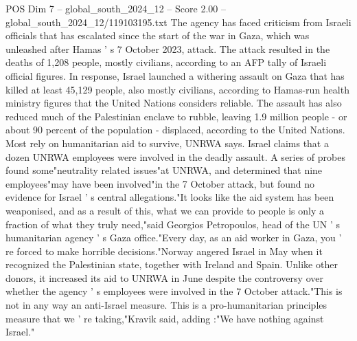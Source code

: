 \begin{textsample}{POS Dim 7 – global\_south\_2024\_12 – Score 2.00 – global\_south\_2024\_12/119103195.txt}
The agency has faced criticism from Israeli officials that has escalated since the start of the war in Gaza, which was unleashed after Hamas ' s 7 October 2023, attack.
The attack resulted in the deaths of 1,208 people, mostly civilians, according to an AFP tally of Israeli official figures.
In response, Israel launched a withering assault on Gaza that has killed at least 45,129 people, also mostly civilians, according to Hamas-run health ministry figures that the United Nations considers reliable.
The assault has also reduced much of the Palestinian enclave to rubble, leaving 1.9 million people - or about 90 percent of the population - displaced, according to the United Nations.
Most rely on humanitarian aid to survive, UNRWA says.
Israel claims that a dozen UNRWA employees were involved in the deadly assault.
A series of probes found some"neutrality related issues"at UNRWA, and determined that nine employees"may have been involved"in the 7 October attack, but found no evidence for Israel ' s central allegations."It looks like the aid system has been weaponised, and as a result of this, what we can provide to people is only a fraction of what they truly need,"said Georgios Petropoulos, head of the UN ' s humanitarian agency ' s Gaza office."Every day, as an aid worker in Gaza, you ' re forced to make horrible decisions."Norway angered Israel in May when it recognized the Palestinian state, together with Ireland and Spain.
Unlike other donors, it increased its aid to UNRWA in June despite the controversy over whether the agency ' s employees were involved in the 7 October attack."This is not in any way an anti-Israel measure.
This is a pro-humanitarian principles measure that we ' re taking,"Kravik said, adding :"We have nothing against Israel."

\end{textsample}
